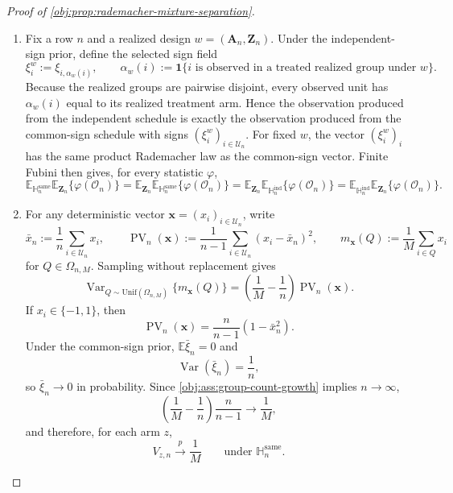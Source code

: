 \documentclass[11pt]{article}
\begin{document}
\begin{proof}[Proof of \cref{obj:prop:rademacher-mixture-separation}]
\begin{enumerate}
\item Fix a row \(n\) and a realized design \(w=(\mathbf A_n,\mathbf Z_n)\).  Under the independent-sign prior, define the selected sign field
\[
\xi_i^{w}:=\xi_{i,\alpha_w(i)},
\qquad
\alpha_w(i):=\mathbf 1\{i\text{ is observed in a treated realized group under }w\}.
\]
Because the realized groups are pairwise disjoint, every observed unit has \(\alpha_w(i)\) equal to its realized treatment arm.  Hence the observation produced from the independent schedule is exactly the observation produced from the common-sign schedule with signs \((\xi_i^w)_{i\in\mathcal U_n}\).  For fixed \(w\), the vector \((\xi_i^w)_i\) has the same product Rademacher law as the common-sign vector.  Finite Fubini then gives, for every statistic \(\varphi\),
\[
\mathbb E_{\mathbb H_n^{\mathrm{same}}}\mathbb E_{\mathbf Z_n}\{\varphi(\mathcal O_n)\}
=
\mathbb E_{\mathbf Z_n}\mathbb E_{\mathbb H_n^{\mathrm{same}}}\{\varphi(\mathcal O_n)\}
=
\mathbb E_{\mathbf Z_n}\mathbb E_{\mathbb H_n^{\mathrm{ind}}}\{\varphi(\mathcal O_n)\}
=
\mathbb E_{\mathbb H_n^{\mathrm{ind}}}\mathbb E_{\mathbf Z_n}\{\varphi(\mathcal O_n)\}.
\]

\item For any deterministic vector \(\boldsymbol x=(x_i)_{i\in\mathcal U_n}\), write
\[
\bar x_n:=\frac1n\sum_{i\in\mathcal U_n}x_i,
\qquad
\operatorname{PV}_n(\boldsymbol x):=\frac1{n-1}\sum_{i\in\mathcal U_n}(x_i-\bar x_n)^2,
\qquad
m_{\boldsymbol x}(Q):=\frac1M\sum_{i\in Q}x_i
\]
for \(Q\in\Omega_{n,M}\).  Sampling without replacement gives
\[
\operatorname{Var}_{Q\sim\mathrm{Unif}(\Omega_{n,M})}\{m_{\boldsymbol x}(Q)\}
=
\left(\frac1M-\frac1n\right)\operatorname{PV}_n(\boldsymbol x).
\]
If \(x_i\in\{-1,1\}\), then
\[
\operatorname{PV}_n(\boldsymbol x)
=
\frac n{n-1}\left(1-\bar x_n^2\right).
\]
Under the common-sign prior, \(\mathbb E\bar\xi_n=0\) and
\[
\operatorname{Var}(\bar\xi_n)=\frac1n,
\]
so \(\bar\xi_n\to 0\) in probability.  Since \cref{obj:ass:group-count-growth} implies \(n\to\infty\),
\[
\left(\frac1M-\frac1n\right)\frac n{n-1}\to\frac1M,
\]
and therefore, for each arm \(z\),
\[
V_{z,n}\stackrel{p}{\longrightarrow}\frac1M
\qquad
\text{under }\mathbb H_n^{\mathrm{same}}.
\]


\end{enumerate}
\end{proof}
\end{document}
